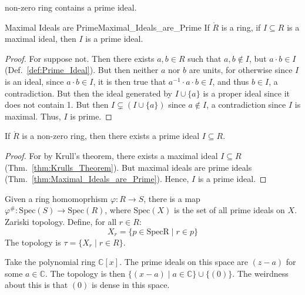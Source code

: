 \documentclass{article}                                                        %
\begin{document}
        non-zero ring contains a prime ideal.
        \begin{ltheorem}{Maximal Ideals are Prime}{Maximal_Ideals_are_Prime}
            If $\ring{R}$ is a ring, if $I\subseteq{R}$ is a maximal ideal, then
            $I$ is a prime ideal.
        \end{ltheorem}
        \begin{proof}
            For suppose not. Then there exists $a,b\in{R}$ such that
            $a,b\notin{I}$, but $a\cdot{b}\in{I}$ (Def.~\ref{def:Prime_Ideal}).
            But then neither $a$ nor $b$ are units, for otherwise since $I$ is
            an ideal, since $a\cdot{b}\in{I}$, it is then true that
            $a^{\minus{1}}\cdot{a}\cdot{b}\in{I}$, and thus $b\in{I}$, a
            contradiction. But then the ideal generated by $I\cup\{a\}$ is a
            proper ideal since it does not contain 1. But then
            $I\subsetneq(I\cup\{a\})$ since $a\notin{I}$, a contradiction since
            $I$ is maximal. Thus, $I$ is prime.
        \end{proof}
        \begin{theorem}
            \label{thm:Existence_of_Prime_Ideals}%
            If $\ring{R}$ is a non-zero ring, then there exists a prime ideal
            $I\subseteq{R}$.
        \end{theorem}
        \begin{proof}
            For by Krull's theorem, there exists a maximal ideal
            $I\subseteq{R}$ (Thm.~\ref{thm:Krulls_Theorem}). But maximal ideals
            are prime ideals (Thm.~\ref{thm:Maximal_Ideals_are_Prime}). Hence,
            $I$ is a prime ideal.
        \end{proof}
        Given a ring homomoprhism $\varphi:R\rightarrow{S}$, there is a map
        $\varphi^{\#}:\textrm{Spec}(S)\rightarrow\textrm{Spec}(R)$, where
        $\textrm{Spec}(X)$ is the set of all prime ideals on $X$.
        Zariski topology. Define, for all $r\in{R}$:
        \begin{equation}
            X_{r}=\{p\in\textrm{Spec{R}}\;|\;r\in{p}\}
        \end{equation}
        The topology is $\tau=\{X_{r}\;|\;r\in{R}\}$.
        \begin{example}
            Take the polynomial ring $\mathbb{C}[x]$. The prime ideals on this
            space are $(z-a)$ for some $a\in\mathbb{C}$. The topology is then
            $\{(x-a)\;|\;a\in\mathbb{C}\}\cup\{(0)\}$. The weirdness about this
            is that $(0)$ is dense in this space.
        \end{example}
\end{document}
